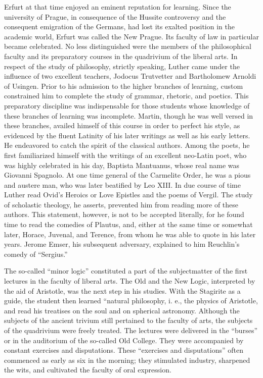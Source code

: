 Erfurt at that time enjoyed an eminent reputation for learning.
Since the university of Prague, in consequence of the Hussite controversy and the consequent emigration of the Germans, had lost its
exalted position in the academic world, Erfurt was called the New
Prague. Its faculty of law in particular became celebrated. No less
distinguished were the members of the philosophical faculty and its
preparatory courses in the quadrivium of the liberal arts. In respect of
the study of philosophy, strictly speaking, Luther came under the influence of two excellent teachers, Jodocus Trutvetter and Bartholomew Arnoldi of Usingen. Prior to his admission to the higher
branches of learning, custom constrained him to complete the study
of grammar, rhetoric, and poetics. This preparatory discipline was indispensable for those students whose knowledge of these branches of
learning was incomplete. Martin, though he was well versed in these
branches, availed himself of this course in order to perfect his style,
as evidenced by the fluent Latinity of his later writings as well as his
early letters. He endeavored to catch the spirit of the classical authors.
Among the poets, he first familiarized himself with the writings of
an excellent neo-Latin poet, who was highly celebrated in his day,
Baptista Mantuanus, whose real name was Giovanni Spagnolo. At one
time general of the Carmelite Order, he was a pious and austere man,
who was later beatified by Leo XIII. In due course of time Luther
read Ovid’s Heroics or Love Epistles and the poems of Vergil. The
study of scholastic theology, he asserts, prevented him from reading
more of these authors. This statement, however, is not to be accepted
literally, for he found time to read the comedies of Plautus, and,
either at the same time or somewhat later, Horace, Juvenal, and Terence, from whom he was able to quote in his later years. Jerome Emser, his subsequent adversary, explained to him Reuchlin’s comedy of
“Sergius.”

The so-called “minor logic” constituted a part of the subjectmatter of the first lectures in the faculty of liberal arts. The Old
and the New Logic, interpreted by the aid of Aristotle, was the next
step in his studies. With the Stagirite as a guide, the student then
learned “natural philosophy, i. e., the physics of Aristotle, and read his
treatises on the soul and on spherical astronomy. Although the subjects of the ancient trivium still pertained to the faculty of arts, the
subjects of the quadrivium were freely treated. The lectures were delivered in the “burses” or in the auditorium of the so-called Old College. They were accompanied by constant exercises and disputations.
These “exercises and disputations” often commenced as early as six
in the morning; they stimulated industry, sharpened the wits, and
cultivated the faculty of oral expression.

